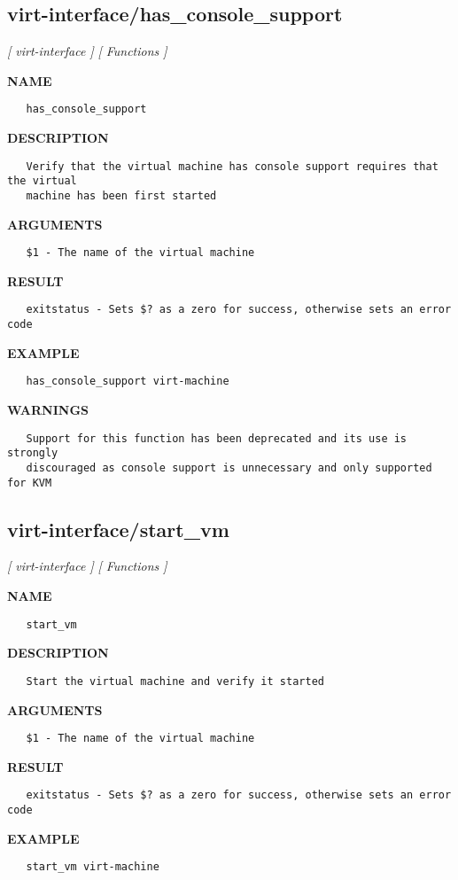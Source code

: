 \subsection{virt-interface/has\_console\_support}
\textsl{[ virt-interface ]}
\textsl{[ Functions ]}

\label{ch:robo38}
\label{ch:virt_interface_has_console_support}
\textbf{NAME}
\begin{verbatim}
   has_console_support
\end{verbatim}
\textbf{DESCRIPTION}
\begin{verbatim}
   Verify that the virtual machine has console support requires that the virtual
   machine has been first started
\end{verbatim}
\textbf{ARGUMENTS}
\begin{verbatim}
   $1 - The name of the virtual machine
\end{verbatim}
\textbf{RESULT}
\begin{verbatim}
   exitstatus - Sets $? as a zero for success, otherwise sets an error code
\end{verbatim}
\textbf{EXAMPLE}
\begin{verbatim}
   has_console_support virt-machine
\end{verbatim}
\textbf{WARNINGS}
\begin{verbatim}
   Support for this function has been deprecated and its use is strongly
   discouraged as console support is unnecessary and only supported for KVM
\end{verbatim}
\newpage
\subsection{virt-interface/start\_vm}
\textsl{[ virt-interface ]}
\textsl{[ Functions ]}

\label{ch:robo39}
\label{ch:virt_interface_start_vm}
\textbf{NAME}
\begin{verbatim}
   start_vm
\end{verbatim}
\textbf{DESCRIPTION}
\begin{verbatim}
   Start the virtual machine and verify it started
\end{verbatim}
\textbf{ARGUMENTS}
\begin{verbatim}
   $1 - The name of the virtual machine
\end{verbatim}
\textbf{RESULT}
\begin{verbatim}
   exitstatus - Sets $? as a zero for success, otherwise sets an error code
\end{verbatim}
\textbf{EXAMPLE}
\begin{verbatim}
   start_vm virt-machine
\end{verbatim}
\newpage
